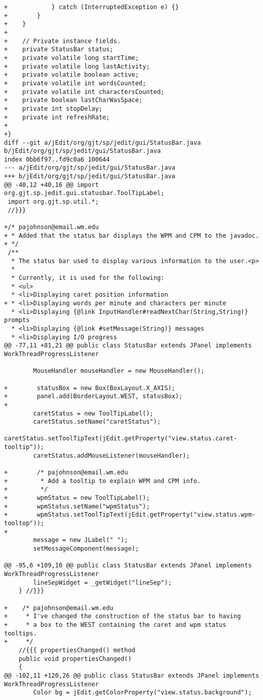 \documentclass[12pt]{article}
\begin{document}
\begin{verbatim}
+            } catch (InterruptedException e) {}
+        }        
+    }
+
+    // Private instance fields.
+    private StatusBar status;
+    private volatile long startTime;
+    private volatile long lastActivity;
+    private volatile boolean active;
+    private volatile int wordsCounted;
+    private volatile int charactersCounted;
+    private boolean lastCharWasSpace;
+    private int stopDelay;
+    private int refreshRate;
+
+}
diff --git a/jEdit/org/gjt/sp/jedit/gui/StatusBar.java b/jEdit/org/gjt/sp/jedit/gui/StatusBar.java
index 0bb6f97..fd9c0a6 100644
--- a/jEdit/org/gjt/sp/jedit/gui/StatusBar.java
+++ b/jEdit/org/gjt/sp/jedit/gui/StatusBar.java
@@ -40,12 +40,16 @@ import org.gjt.sp.jedit.gui.statusbar.ToolTipLabel;
 import org.gjt.sp.util.*;
 //}}}
 
+/* pajohnson@email.wm.edu
+ * Added that the status bar displays the WPM and CPM to the javadoc.
+ */
 /**
  * The status bar used to display various information to the user.<p>
  *
  * Currently, it is used for the following:
  * <ul>
  * <li>Displaying caret position information
+ * <li>Displaying words per minute and characters per minute
  * <li>Displaying {@link InputHandler#readNextChar(String,String)} prompts
  * <li>Displaying {@link #setMessage(String)} messages
  * <li>Displaying I/O progress
@@ -77,11 +81,21 @@ public class StatusBar extends JPanel implements WorkThreadProgressListener
 
 		MouseHandler mouseHandler = new MouseHandler();
 
+        statusBox = new Box(BoxLayout.X_AXIS);
+        panel.add(BorderLayout.WEST, statusBox);
+
 		caretStatus = new ToolTipLabel();
 		caretStatus.setName("caretStatus");
 		caretStatus.setToolTipText(jEdit.getProperty("view.status.caret-tooltip"));
 		caretStatus.addMouseListener(mouseHandler);
 
+        /* pajohnson@email.wm.edu
+         * Add a tooltip to explain WPM and CPM info.
+         */
+        wpmStatus = new ToolTipLabel();
+        wpmStatus.setName("wpmStatus");
+        wpmStatus.setToolTipText(jEdit.getProperty("view.status.wpm-tooltop"));
+
 		message = new JLabel(" ");
 		setMessageComponent(message);
 
@@ -95,6 +109,10 @@ public class StatusBar extends JPanel implements WorkThreadProgressListener
 		lineSepWidget = _getWidget("lineSep");
 	} //}}}
 
+    /* pajohnson@email.wm.edu
+     * I've changed the construction of the status bar to having
+     * a box to the WEST containing the caret and wpm status tooltips.
+     */
 	//{{{ propertiesChanged() method
 	public void propertiesChanged()
 	{
@@ -102,11 +120,26 @@ public class StatusBar extends JPanel implements WorkThreadProgressListener
 		Color bg = jEdit.getColorProperty("view.status.background");
 

\end{verbatim}
\end{document}
